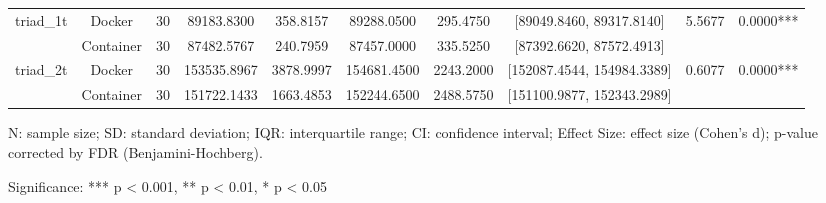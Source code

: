 \documentclass{article}
\begin{document}
\begin{table}[h]
\begin{tabular}{lccccccccc}
\multirow{2}{*}{triad\_1t} & Docker & 30 & 89183.8300 & 358.8157 & 89288.0500 & 295.4750 & [89049.8460, 89317.8140] & 5.5677 & 0.0000*** \\
 & Container & 30 & 87482.5767 & 240.7959 & 87457.0000 & 335.5250 & [87392.6620, 87572.4913] &  &  \\
\midrule
\multirow{2}{*}{triad\_2t} & Docker & 30 & 153535.8967 & 3878.9997 & 154681.4500 & 2243.2000 & [152087.4544, 154984.3389] & 0.6077 & 0.0000*** \\
 & Container & 30 & 151722.1433 & 1663.4853 & 152244.6500 & 2488.5750 & [151100.9877, 152343.2989] &  &  \\
\midrule
\bottomrule
\end{tabular}
\begin{tablenotes}
\small
\item N: sample size; SD: standard deviation; IQR: interquartile range; CI: confidence interval; Effect Size: effect size (Cohen's d); p-value corrected by FDR (Benjamini-Hochberg).
\item Significance: *** p < 0.001, ** p < 0.01, * p < 0.05
\end{tablenotes}
\end{table}
\end{document}
